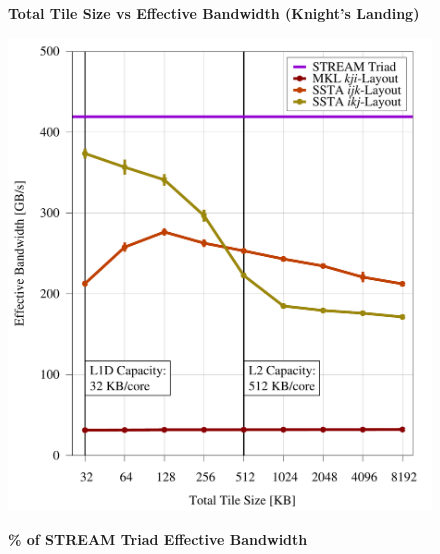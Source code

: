 \documentclass{sig-alternate-05-2015}
\begin{document}
\begin{figure}[!bth]
  \captionsetup{width=0.39\textwidth}
  \begin{minipage}{0.49\textwidth}
    \centering
    \label{fig:results:tile_size_knl}
    \caption{
      \textbf{Total Tile Size vs Effective Bandwidth (Knight's Landing)}
    }
    \includegraphics[width=0.95\columnwidth]{figures/post_tsb_tw_sweep_full_matrix_double_precision_production_carl_knl_7210_09_02_2016_64pus.pdf}
  \end{minipage}
  \begin{minipage}{0.49\textwidth}
    \centering
    \label{fig:results:efficiency}
    \caption{
      \textbf{\% of STREAM Triad Effective Bandwidth}
    }

\end{minipage}
\end{figure}
\end{document}
